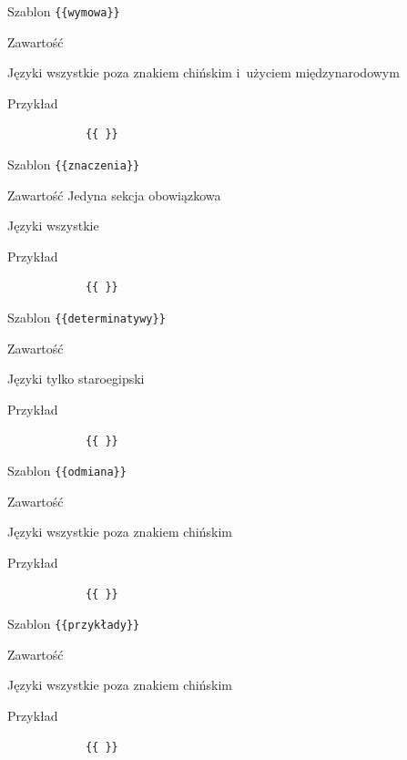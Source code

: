 \documentclass{pracamgr}
\newcommand{\spacer}{
	\begin{center}
		\textasteriskcentered
	\end{center}
}
\newenvironment{description-sub}[0]{
	\begin{basedescript}{\desclabelstyle{\pushlabel}\desclabelwidth{6em}}\setlength{\itemsep}{-2mm}
}{
	\end{basedescript}
}
\begin{document}
\spacer
\begin{description-sub}
	\item[Szablon] \verb|{{wymowa}}|
	\item[Zawartość]
	\item[Języki] wszystkie poza znakiem chińskim i~użyciem międzynarodowym
	\item[Przykład]
		\begin{verbatim}
			{{ }}
		\end{verbatim}
\end{description-sub}
\spacer
\begin{description-sub}
	\item[Szablon] \verb|{{znaczenia}}|
	\item[Zawartość] Jedyna sekcja obowiązkowa
	\item[Języki] wszystkie
	\item[Przykład]
		\begin{verbatim}
			{{ }}
		\end{verbatim}
\end{description-sub}
\spacer
\begin{description-sub}
	\item[Szablon] \verb|{{determinatywy}}|
	\item[Zawartość]
	\item[Języki] tylko staroegipski
	\item[Przykład]
		\begin{verbatim}
			{{ }}
		\end{verbatim}
\end{description-sub}
\spacer
\begin{description-sub}
	\item[Szablon] \verb|{{odmiana}}|
	\item[Zawartość]
	\item[Języki] wszystkie poza znakiem chińskim
	\item[Przykład]
		\begin{verbatim}
			{{ }}
		\end{verbatim}
\end{description-sub}
\spacer
\begin{description-sub}
	\item[Szablon] \verb|{{przykłady}}|
	\item[Zawartość]
	\item[Języki] wszystkie poza znakiem chińskim
	\item[Przykład]
		\begin{verbatim}
			{{ }}
		\end{verbatim}
\end{description-sub}
\end{document}
